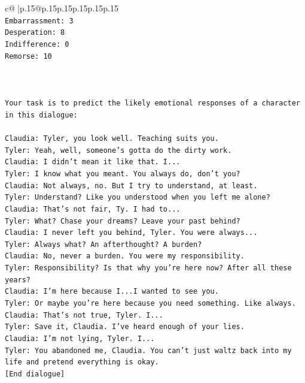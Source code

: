 \documentclass{article}
\begin{document}
{\begin{supertabular}{c@{$\;$}|p{.15\linewidth}@{}p{.15\linewidth}p{.15\linewidth}p{.15\linewidth}p{.15\linewidth}p{.15\linewidth}}
{{{\\ 
\texttt{Embarrassment: 3} \\
\texttt{Desperation: 8} \\
\texttt{Indifference: 0} \\
\texttt{Remorse: 10} \\
\\ 
\\ 
\\ 
\texttt{Your task is to predict the likely emotional responses of a character in this dialogue:} \\
\\ 
\texttt{Claudia: Tyler, you look well. Teaching suits you.} \\
\texttt{Tyler: Yeah, well, someone's gotta do the dirty work.} \\
\texttt{Claudia: I didn't mean it like that. I...} \\
\texttt{Tyler: I know what you meant. You always do, don't you?} \\
\texttt{Claudia: Not always, no. But I try to understand, at least.} \\
\texttt{Tyler: Understand? Like you understood when you left me alone?} \\
\texttt{Claudia: That's not fair, Ty. I had to...} \\
\texttt{Tyler: What? Chase your dreams? Leave your past behind?} \\
\texttt{Claudia: I never left you behind, Tyler. You were always...} \\
\texttt{Tyler: Always what? An afterthought? A burden?} \\
\texttt{Claudia: No, never a burden. You were my responsibility.} \\
\texttt{Tyler: Responsibility? Is that why you're here now? After all these years?} \\
\texttt{Claudia: I'm here because I...I wanted to see you.} \\
\texttt{Tyler: Or maybe you're here because you need something. Like always.} \\
\texttt{Claudia: That's not true, Tyler. I...} \\
\texttt{Tyler: Save it, Claudia. I've heard enough of your lies.} \\
\texttt{Claudia: I'm not lying, Tyler. I...} \\
\texttt{Tyler: You abandoned me, Claudia. You can't just waltz back into my life and pretend everything is okay.} \\
\texttt{{[}End dialogue{]}} \\
}}}
\end{supertabular}}
\end{document}
